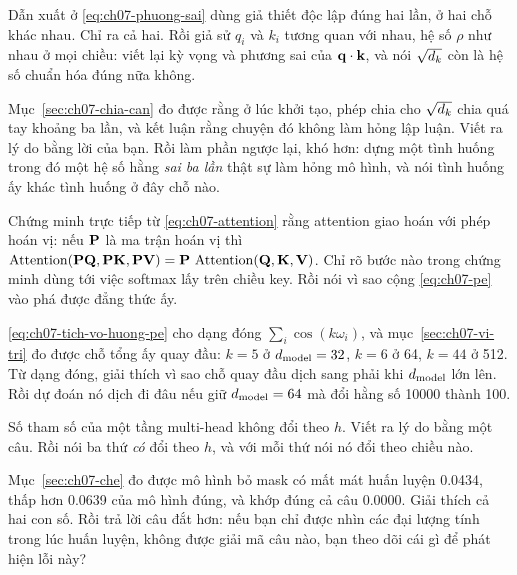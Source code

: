 \exercises

\tierunderstand

\begin{bt}
  \item Dẫn xuất ở \eqref{eq:ch07-phuong-sai} dùng giả thiết độc lập đúng hai
    lần, ở hai chỗ khác nhau. Chỉ ra cả hai. Rồi giả sử \(q_i\) và \(k_i\)
    tương quan với nhau, hệ số \(\rho\) như nhau ở mọi chiều: viết lại kỳ vọng
    và phương sai của \(\mathbf{q} \cdot \mathbf{k}\), và nói \(\sqrt{d_{k}}\) còn là
    hệ số chuẩn hóa đúng nữa không.

  \item Mục~\ref{sec:ch07-chia-can} đo được rằng ở lúc khởi tạo, phép chia cho
    \(\sqrt{d_{k}}\) chia quá tay khoảng ba lần, và kết luận rằng chuyện đó không
    làm hỏng lập luận. Viết ra lý do bằng lời của bạn. Rồi làm phần ngược lại,
    khó hơn: dựng một tình huống trong đó một hệ số hằng \emph{sai ba lần} thật
    sự làm hỏng mô hình, và nói tình huống ấy khác tình huống ở đây chỗ nào.

  \item Chứng minh trực tiếp từ \eqref{eq:ch07-attention} rằng attention giao
    hoán với phép hoán vị: nếu \(\mathbf{P}\) là ma trận hoán vị thì
    \(\operatorname{Attention}(\mathbf{P}\mathbf{Q}, \mathbf{P}\mathbf{K}, \mathbf{P}\mathbf{V}) = \mathbf{P}\,
    \operatorname{Attention}(\mathbf{Q}, \mathbf{K}, \mathbf{V})\). Chỉ rõ bước nào trong chứng minh
    dùng tới việc softmax lấy trên chiều key. Rồi nói vì sao cộng
    \eqref{eq:ch07-pe} vào phá được đẳng thức ấy.

  \item \eqref{eq:ch07-tich-vo-huong-pe} cho dạng đóng
    \(\sum_i \cos(k\omega_i)\), và mục~\ref{sec:ch07-vi-tri} đo được chỗ tổng ấy
    quay đầu: \(k = 5\) ở \(d_{\mathrm{model}} = 32\), \(k = 6\) ở 64, \(k = 44\) ở 512.
    Từ dạng đóng, giải thích vì sao chỗ quay đầu dịch sang phải khi \(d_{\mathrm{model}}\)
    lớn lên. Rồi dự đoán nó dịch đi đâu nếu giữ \(d_{\mathrm{model}} = 64\) mà đổi hằng số
    10000 thành 100.

  \item Số tham số của một tầng multi-head không đổi theo \(h\). Viết ra lý do
    bằng một câu. Rồi nói ba thứ \emph{có} đổi theo \(h\), và với mỗi thứ nói
    nó đổi theo chiều nào.

  \item Mục~\ref{sec:ch07-che} đo được mô hình bỏ mask có mất mát huấn luyện
    0.0434, thấp hơn 0.0639 của mô hình đúng, và khớp đúng cả câu 0.0000. Giải
    thích cả hai con số. Rồi trả lời câu đắt hơn: nếu bạn chỉ được nhìn các đại
    lượng tính trong lúc huấn luyện, không được giải mã câu nào, bạn theo dõi
    cái gì để phát hiện lỗi này?


\end{bt}
